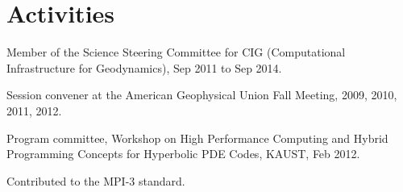 \documentclass[10pt,letterpaper]{article}
\renewenvironment{itemize}{
  \begin{list}{}{
    \setlength{\leftmargin}{1.5em}
    \setlength{\itemsep}{0.25em}
    \setlength{\parskip}{0pt}
    \setlength{\parsep}{0.25em}
  }
}{
  \end{list}
}
\begin{document}
\section*{Activities}
\begin{itemize}
\item Member of the Science Steering Committee for CIG (Computational Infrastructure for Geodynamics), Sep 2011 to Sep 2014.
\item Session convener at the American Geophysical Union Fall Meeting, 2009, 2010, 2011, 2012.
\item Program committee, Workshop on High Performance Computing and Hybrid Programming Concepts for Hyperbolic PDE Codes, KAUST, Feb 2012.
\item Contributed to the MPI-3 standard.
\end{itemize}


\end{document}
